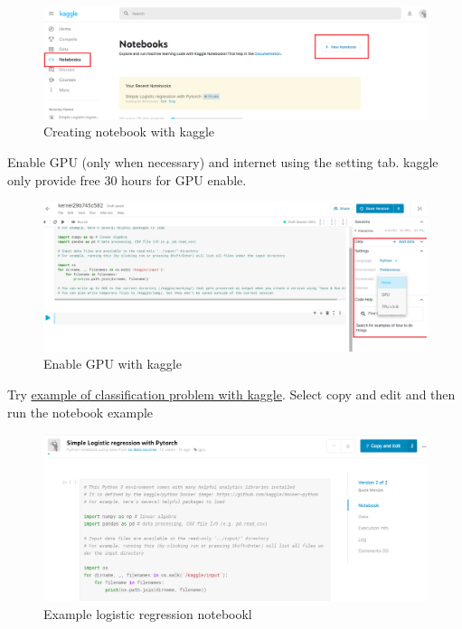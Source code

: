 \documentclass[a4paper,10pt]{article}
\begin{document}
\begin{figure}[H]
\centering
\includegraphics[width=1\columnwidth]{Pictures/kaggle_notebook.png}
\caption[Short title]{Creating notebook with kaggle}
\label{fig:ff1}\end{figure}
\vspace{5mm}

Enable GPU (only when necessary) and internet using the setting tab. kaggle only provide free 30 hours for GPU enable.  
\vspace{5mm}

\begin{figure}[H]
\centering
\includegraphics[width=1\columnwidth]{Pictures/kaggle_GPU.png}
\caption[Short title]{Enable GPU with kaggle}
\label{fig:ff1}\end{figure}

\newpage
Try \href{https://www.kaggle.com/trungnguyen0987/simple-logistic-regression-with-pytorch}{example of classification problem with kaggle}. Select copy and edit and then run the notebook example  

\begin{figure}[H]
\centering
\includegraphics[width=1\columnwidth]{Pictures/kaggle_copy.png}
\caption[Short title]{Example logistic regression notebookl}
\label{fig:ff1}\end{figure}
\end{document}
